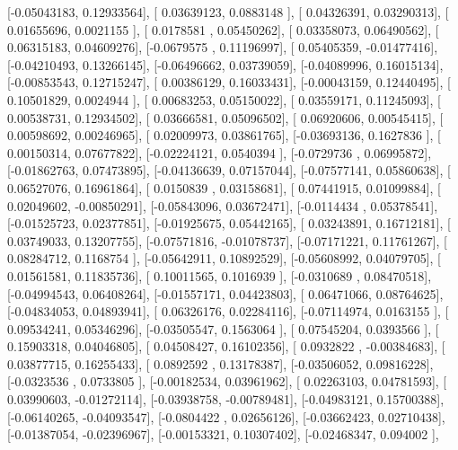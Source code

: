 \documentclass{article}
\begin{document}
       [-0.05043183,  0.12933564],
       [ 0.03639123,  0.0883148 ],
       [ 0.04326391,  0.03290313],
       [ 0.01655696,  0.0021155 ],
       [ 0.0178581 ,  0.05450262],
       [ 0.03358073,  0.06490562],
       [ 0.06315183,  0.04609276],
       [-0.0679575 ,  0.11196997],
       [ 0.05405359, -0.01477416],
       [-0.04210493,  0.13266145],
       [-0.06496662,  0.03739059],
       [-0.04089996,  0.16015134],
       [-0.00853543,  0.12715247],
       [ 0.00386129,  0.16033431],
       [-0.00043159,  0.12440495],
       [ 0.10501829,  0.0024944 ],
       [ 0.00683253,  0.05150022],
       [ 0.03559171,  0.11245093],
       [ 0.00538731,  0.12934502],
       [ 0.03666581,  0.05096502],
       [ 0.06920606,  0.00545415],
       [ 0.00598692,  0.00246965],
       [ 0.02009973,  0.03861765],
       [-0.03693136,  0.1627836 ],
       [ 0.00150314,  0.07677822],
       [-0.02224121,  0.0540394 ],
       [-0.0729736 ,  0.06995872],
       [-0.01862763,  0.07473895],
       [-0.04136639,  0.07157044],
       [-0.07577141,  0.05860638],
       [ 0.06527076,  0.16961864],
       [ 0.0150839 ,  0.03158681],
       [ 0.07441915,  0.01099884],
       [ 0.02049602, -0.00850291],
       [-0.05843096,  0.03672471],
       [-0.0114434 ,  0.05378541],
       [-0.01525723,  0.02377851],
       [-0.01925675,  0.05442165],
       [ 0.03243891,  0.16712181],
       [ 0.03749033,  0.13207755],
       [-0.07571816, -0.01078737],
       [-0.07171221,  0.11761267],
       [ 0.08284712,  0.1168754 ],
       [-0.05642911,  0.10892529],
       [-0.05608992,  0.04079705],
       [ 0.01561581,  0.11835736],
       [ 0.10011565,  0.1016939 ],
       [-0.0310689 ,  0.08470518],
       [-0.04994543,  0.06408264],
       [-0.01557171,  0.04423803],
       [ 0.06471066,  0.08764625],
       [-0.04834053,  0.04893941],
       [ 0.06326176,  0.02284116],
       [-0.07114974,  0.0163155 ],
       [ 0.09534241,  0.05346296],
       [-0.03505547,  0.1563064 ],
       [ 0.07545204,  0.0393566 ],
       [ 0.15903318,  0.04046805],
       [ 0.04508427,  0.16102356],
       [ 0.0932822 , -0.00384683],
       [ 0.03877715,  0.16255433],
       [ 0.0892592 ,  0.13178387],
       [-0.03506052,  0.09816228],
       [-0.0323536 ,  0.0733805 ],
       [-0.00182534,  0.03961962],
       [ 0.02263103,  0.04781593],
       [ 0.03990603, -0.01272114],
       [-0.03938758, -0.00789481],
       [-0.04983121,  0.15700388],
       [-0.06140265, -0.04093547],
       [-0.0804422 ,  0.02656126],
       [-0.03662423,  0.02710438],
       [-0.01387054, -0.02396967],
       [-0.00153321,  0.10307402],
       [-0.02468347,  0.094002  ],
\end{document}
